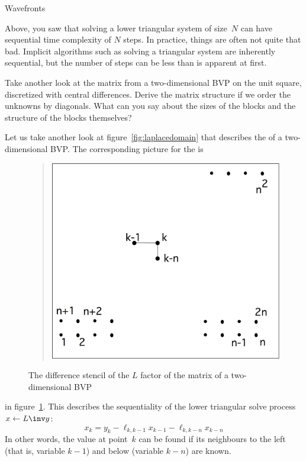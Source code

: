  {Wavefronts}
\label{sec:wavefront}

Above, you saw that solving a lower triangular system of size~$N$ can
have sequential time complexity of $N$ steps. In practice, things are
often not quite that bad. Implicit algorithms such as solving a
triangular system are inherently sequential, but the number of 
steps can be less than is apparent at first.

\begin{exercise}
  Take another look at the matrix from a two-dimensional \ac{BVP} on
  the unit square,
  discretized with central differences.
  Derive the matrix structure if we
  order the unknowns by diagonals. What can you say about the sizes of
  the blocks and the structure of the blocks themselves?
\end{exercise}

Let us take another look at
figure~\ref{fig:laplacedomain} that describes the
%
of a two-dimensional \ac{BVP}. The corresponding picture for the
%
 is
\begin{figure}
  \begin{quote}
    \includegraphics[scale=.12]{graphics/laplacelower}
  \end{quote}
  \caption{The difference stencil of the $L$ factor of the matrix
    of a two-dimensional \ac{BVP}}
  \label{fig:laplacelower}
\end{figure}
in figure~\ref{fig:laplacelower}. This describes the sequentiality of
the lower triangular solve process $x\leftarrow L\inv y$:
\[ x_k = y_k - \ell_{k,k-1}x_{k-1} - \ell_{k,k-n}x_{k-n} \]
In other words, the value at point~$k$ can be found if its neighbours
to the left (that is, variable $k-1$) and below (variable $k-n$) are
known. 

